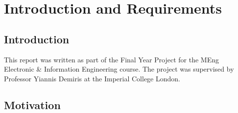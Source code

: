 \chapter{Introduction and Requirements}

\section{Introduction}
This report was written as part of the Final Year Project for the MEng Electronic \& Information Engineering course. The project was supervised by Professor Yiannis Demiris at the Imperial College London.

\section{Motivation}

